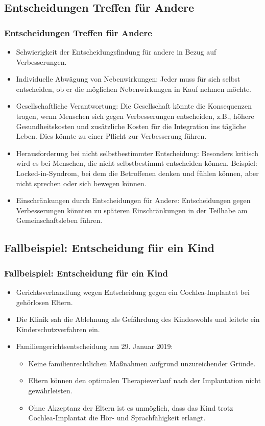 \documentclass[aspectratio=169,16pt,xcolor=table]{beamer}
\begin{document}
\subsection*{Entscheidungen Treffen für Andere}
\begin{frame}
  \frametitle{Entscheidungen Treffen für Andere}
  \begin{itemize}
    \item Schwierigkeit der Entscheidungsfindung für andere in Bezug auf Verbesserungen\cite{plavsienkova2021healthy}.
    \item Individuelle Abwägung von Nebenwirkungen: Jeder muss für sich selbst entscheiden, ob er die möglichen Nebenwirkungen in Kauf nehmen möchte.
    \item Gesellschaftliche Verantwortung: Die Gesellschaft könnte die Konsequenzen tragen, wenn Menschen sich gegen Verbesserungen entscheiden, z.B., höhere Gesundheitskosten und zusätzliche Kosten für die Integration ins tägliche Leben. Dies könnte zu einer Pflicht zur Verbesserung führen.
    \item Herausforderung bei nicht selbstbestimmter Entscheidung: Besonders kritisch wird es bei Menschen, die nicht selbstbestimmt entscheiden können. Beispiel: Locked-in-Syndrom, bei dem die Betroffenen denken und fühlen können, aber nicht sprechen oder sich bewegen können\cite{das2022locked}.
    \item Einschränkungen durch Entscheidungen für Andere: Entscheidungen gegen Verbesserungen könnten zu späteren Einschränkungen in der Teilhabe am Gemeinschaftsleben führen.
  \end{itemize}
\end{frame}

\subsection*{Fallbeispiel: Entscheidung für ein Kind}
\begin{frame}
  \frametitle{Fallbeispiel: Entscheidung für ein Kind}
  \begin{itemize}
    \item Gerichtsverhandlung wegen Entscheidung gegen ein Cochlea-Implantat bei gehörlosen Eltern\cite{brde}.
    \item Die Klinik sah die Ablehnung als Gefährdung des Kindeswohls und leitete ein Kinderschutzverfahren ein.
    \item Familiengerichtsentscheidung am 29. Januar 2019:
    \begin{itemize}
      \item Keine familienrechtlichen Maßnahmen aufgrund unzureichender Gründe.
      \item Eltern können den optimalen Therapieverlauf nach der Implantation nicht gewährleisten.
      \item Ohne Akzeptanz der Eltern ist es unmöglich, dass das Kind trotz Cochlea-Implantat die Hör- und Sprachfähigkeit erlangt.~\cite{brde}
    \end{itemize}
  \end{itemize}
\end{frame}
\end{document}
